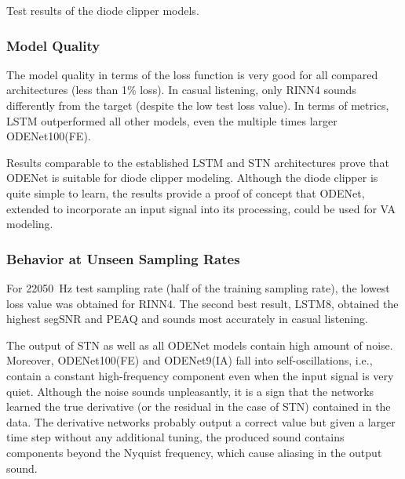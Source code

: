 \begin{table}[]
    \caption{Test results of the diode clipper models.}
    
    \label{tab:diode_clipper_results}
\end{table}

\subsubsection{Model Quality}

The model quality in terms of the loss function is very good for all compared architectures (less than 1\% loss). In casual listening, only \ac{RINN}4 sounds differently from the target (despite the low test loss value). In terms of metrics, \ac{LSTM} outperformed all other models, even the multiple times larger ODENet100(FE).

Results comparable to the established \ac{LSTM} and \ac{STN} architectures prove that ODENet is suitable for diode clipper modeling. Although the diode clipper is quite simple to learn, the results provide a proof of concept that ODENet, extended to incorporate an input signal into its processing, could be used for \ac{VA} modeling.

\subsubsection{Behavior at Unseen Sampling Rates}

For \SI{22050}{Hz} test sampling rate (half of the training sampling rate), the lowest loss value was obtained for \ac{RINN}4. The second best result, \ac{LSTM}8, obtained the highest \ac{segSNR} and \ac{PEAQ} and sounds most accurately in casual listening. 

The output of \ac{STN} as well as all ODENet models contain high amount of noise. Moreover, ODENet100(FE) and ODENet9(IA) fall into self-oscillations, i.e., contain a constant high-frequency component even when the input signal is very quiet. Although the noise sounds unpleasantly, it is a sign that the networks learned the true derivative (or the residual in the case of \ac{STN}) contained in the data. The derivative networks probably output a correct value but given a larger time step without any additional tuning, the produced sound contains components beyond the Nyquist frequency, which cause aliasing in the output sound. 

